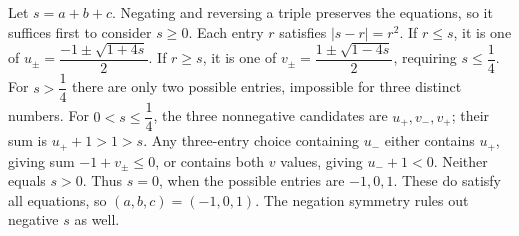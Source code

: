 Let $ s=a+b+c $. Negating and reversing a triple preserves the equations, so it suffices first to consider $ s\ge0 $. Each entry $ r $ satisfies $|s-r|=r^2 $. If $ r\le s $, it is one of $ u_\pm=\dfrac{-1\pm\sqrt{1+4s}}{2}$. If $ r\ge s $, it is one of $ v_\pm=\dfrac{1\pm\sqrt{1-4s}}{2}$, requiring $ s\le\dfrac{1}{4}$. For $ s>\dfrac{1}{4}$ there are only two possible entries, impossible for three distinct numbers. For $ 0<s\le\dfrac{1}{4}$, the three nonnegative candidates are $ u_+,v_-,v_+$; their sum is $ u_++1>1>s $. Any three-entry choice containing $ u_-$ either contains $ u_+$, giving sum $-1+v_\pm\le0 $, or contains both $ v $ values, giving $ u_-+1<0 $. Neither equals $ s>0 $. Thus $ s=0 $, when the possible entries are $-1,0,1 $. These do satisfy all equations, so $\boxed{(a,b,c)=(-1,0,1)}$. The negation symmetry rules out negative $ s $ as well.
